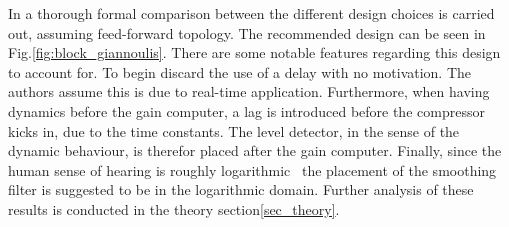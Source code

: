 \documentclass[../main2.tex]{subfiles}
\begin{document}
In \cite{reiss2012tutorial} a thorough formal comparison between the different design choices is carried out, assuming feed-forward topology. The recommended design can be seen in Fig.\ref{fig:block_giannoulis}. There are some notable features regarding this design to account for. To begin \cite{reiss2012tutorial} discard the use of a delay with no motivation. The authors assume this is due to real-time application. Furthermore, when having dynamics before the gain computer, a lag is introduced before the compressor kicks in, due to the time constants. The level detector, in the sense of the dynamic behaviour, is therefor placed after the gain computer. Finally, since the human sense of hearing is roughly logarithmic~\cite{fastl2007psychoacoustics} the placement of the smoothing filter is suggested to be in the logarithmic domain. Further analysis of these results is conducted in the theory section\ref{sec_theory}.
 
\end{document}
